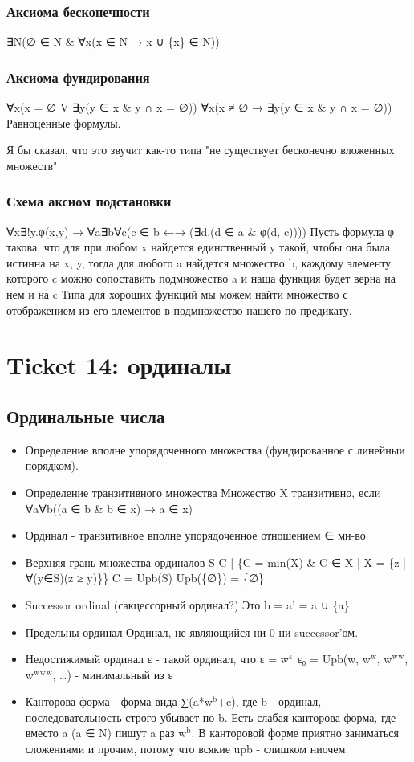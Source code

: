 \documentclass[11pt]{article}
\begin{document}
\subsubsection{Аксиома бесконечности}
\label{sec-15-2-7}
∃N(∅ ∈ N \& ∀x(x ∈ N → x ∪ \{x\} ∈ N))
\subsubsection{Аксиома фундирования}
\label{sec-15-2-8}
∀x(x = ∅ V ∃y(y ∈ x \& y ∩ x = ∅))
∀x(x ≠ ∅ → ∃y(y ∈ x \& y ∩ x = ∅))
Равноценные формулы.

Я бы сказал, что это звучит как-то типа
"не существует бесконечно вложенных множеств"
\subsubsection{Схема аксиом подстановки}
\label{sec-15-2-9}
∀x∃!y.φ(x,y) → ∀a∃b∀c(c ∈ b ←→ (∃d.(d ∈ a \& φ(d, c))))
Пусть формула φ такова, что для при любом x найдется единственный y
такой, чтобы она была истинна на x, y, тогда для любого a
найдется множество b, каждому элементу которого c можно сопоставить
подмножество a и наша функция будет верна на нем и на c
Типа для хороших функций мы можем найти множество с отображением из
его элементов в подмножество нашего по предикату.
\section{Ticket 14: oрдиналы}
\label{sec-16}
\subsection{Ординальные числа}
\label{sec-16-1}
\begin{itemize}
\item Определение вполне упорядоченного множества (фундированное
с линейныи порядком).
\item Определение транзитивного множества
Множество X транзитивно, если
∀a∀b((a ∈ b \& b ∈ x) → a ∈ x)
\item Ординал - транзитивное вполне упорядоченное отношением ∈ мн-во
\item Верхняя грань множества ординалов S
C | \{C = min(X) \& C ∈ X | X = \{z | ∀(y∈S)(z ≥ y)\}\}
C = Upb(S)
Upb(\{∅\}) = \{∅\}
\item Successor ordinal (сакцессорный ординал?)
Это b = a' = a ∪ \{a\}
\item Предельны ординал
Ординал, не являющийся ни 0 ни successor'ом.
\item Недостижимый ординал
ε - такой ординал, что ε = w$^{\text{ε}}$
ε₀ = Upb(w, w$^{\text{w}}$, w$^{\text{w}}$$^{\text{w}}$, w$^{\text{w}}$$^{\text{w}}$$^{\text{w}}$, \ldots{}) - минимальный из ε
\item Канторова форма - форма вида ∑(a*w$^{\text{b}}$+c), где b - ординал, последовательность
строго убывает по b. Есть слабая канторова форма, где вместо a (a ∈ N)
пишут a раз w$^{\text{b}}$. В канторовой форме приятно заниматься сложениями и
прочим, потому что всякие upb - слишком ниочем.
\end{itemize}
\end{document}
